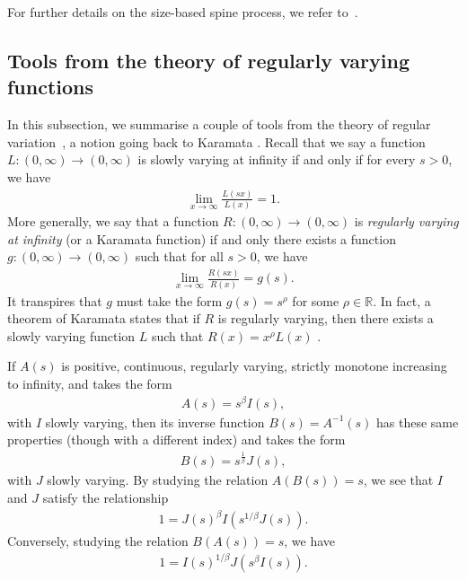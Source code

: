 \documentclass[a4,12pt]{amsart}
\numberwithin{equation}{section}
\begin{document}
    For further details on the size-based spine process, we refer to~\cite[Theorem 3.2 and 3.3]{bertoinbook}.


\subsection{Tools from the theory of regularly varying functions}

    In this subsection, we summarise a couple of tools from the theory of regular variation~\cite{bingham1989regular}, 
    a notion going back to Karamata \cite{Karamata1933}.
    Recall that we say a function $L:(0,\infty) \to (0,\infty)$ is slowly varying at infinity if and only if for every $s > 0$, we have 
    \begin{align*}
    \lim_{x \to \infty} \frac{ L(sx)}{L(x)} = 1.
    \end{align*}
    More generally, we say that a function $R:(0,\infty) \to (0,\infty)$ is \emph{regularly varying at infinity} (or a Karamata function) if and only there exists a function $g:(0,\infty) \to (0,\infty)$ such that for all $s > 0$, we have 
    \begin{align*}
    \lim_{x \to \infty} \frac{R(sx)}{R(x)} = g(s).
    \end{align*}
    It transpires that $g$ must take the form $g(s) = s^\rho$ for some $\rho \in \mathbb{R}$. 
    In fact, a theorem of Karamata states that if $R$ is regularly varying, 
    then there exists a slowly varying function $L$ such that $R(x) = x^\rho L(x)$ \cite{bingham1989regular}.
    
    If $A(s)$ is positive, continuous, regularly varying, strictly monotone increasing to infinity, and takes the form 
    \begin{align} \label{eq:ro1}
    A(s) = s^\beta I(s),
    \end{align}
    with $I$ slowly varying, then its inverse function $B(s) = A^{-1}(s)$ has these same properties (though with a different index) and takes the form 
    \begin{align}  \label{eq:ro2}
    B(s) = s^{\frac{1}{\beta}} J(s), 
    \end{align}
    with $J$ slowly varying. By studying the relation $A(B(s))= s$, we see that $I$ and $J$ satisfy the relationship
    \begin{align}  \label{eq:ro3}
    1 = J(s)^\beta I(s^{1/\beta}J(s)).
    \end{align}
    Conversely, studying the relation $B(A(s)) = s$, we have
    \begin{align}  \label{eq:ro4}
    1 = I(s)^{1/\beta} J( s^\beta I(s)).
    \end{align}
\end{document}

